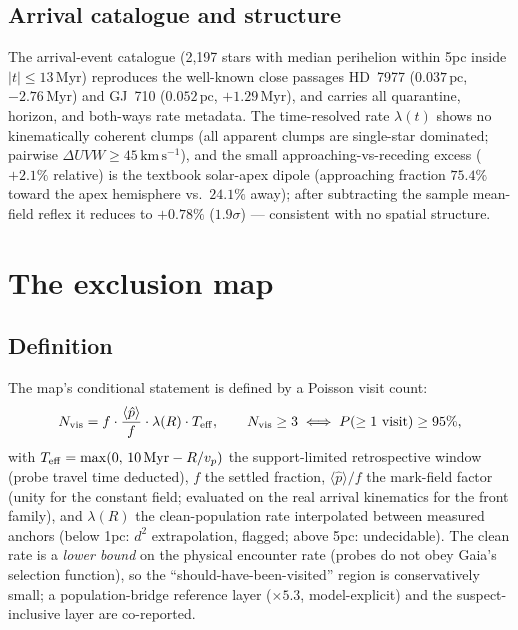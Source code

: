 \documentclass[11pt]{article}
\newcommand{\Myr}{\,\mathrm{Myr}}
\newcommand{\pc}{\,\mathrm{pc}}
\newcommand{\kms}{\,\mathrm{km\,s^{-1}}}
\newcommand{\lam}{\lambda}
\begin{document}
\subsection{Arrival catalogue and structure}
The arrival-event catalogue (2{,}197 stars with median perihelion within
5\;pc inside $|t|\le13\Myr$) reproduces the well-known close passages
HD~7977 ($0.037\pc$, $-2.76\Myr$) and GJ~710 ($0.052\pc$, $+1.29\Myr$), and
carries all quarantine, horizon, and both-ways rate metadata. The
time-resolved rate $\lam(t)$ shows no kinematically coherent clumps (all
apparent clumps are single-star dominated; pairwise $\Delta UVW\ge45\kms$),
and the small approaching-vs-receding excess ($+2.1\%$ relative) is the
textbook solar-apex dipole \cite{schoenrich10} (approaching fraction $75.4\%$ toward the apex
hemisphere vs.\ $24.1\%$ away); after subtracting the sample mean-field
reflex it reduces to $+0.78\%$ ($1.9\sigma$) --- consistent with no spatial
structure.

\section{The exclusion map}\label{sec:map}

\subsection{Definition}
The map's conditional statement is defined by a Poisson visit count:
\begin{equation}
N_{\rm vis} = f\cdot\frac{\langle \hat p\rangle}{f}\cdot\lam(R)\cdot
T_{\rm eff},\qquad
N_{\rm vis}\ge3\;\Longleftrightarrow\;P(\ge1\ \text{visit})\ge95\%,
\label{eq:fstar}
\end{equation}
with $T_{\rm eff}=\max(0,\,10\Myr-R/v_p)$ the support-limited retrospective
window (probe travel time deducted), $f$ the settled fraction,
$\langle\hat p\rangle/f$ the mark-field factor (unity for the constant
field; evaluated on the real arrival kinematics for the front family), and
$\lam(R)$ the clean-population rate interpolated between measured anchors
(below 1\;pc: $d^2$ extrapolation, flagged; above 5\;pc: undecidable).
The clean rate is a \emph{lower bound} on the physical encounter rate
(probes do not obey Gaia's selection function), so the
``should-have-been-visited'' region is conservatively small; a
population-bridge reference layer ($\times5.3$, model-explicit) and the
suspect-inclusive layer are co-reported.
\end{document}
